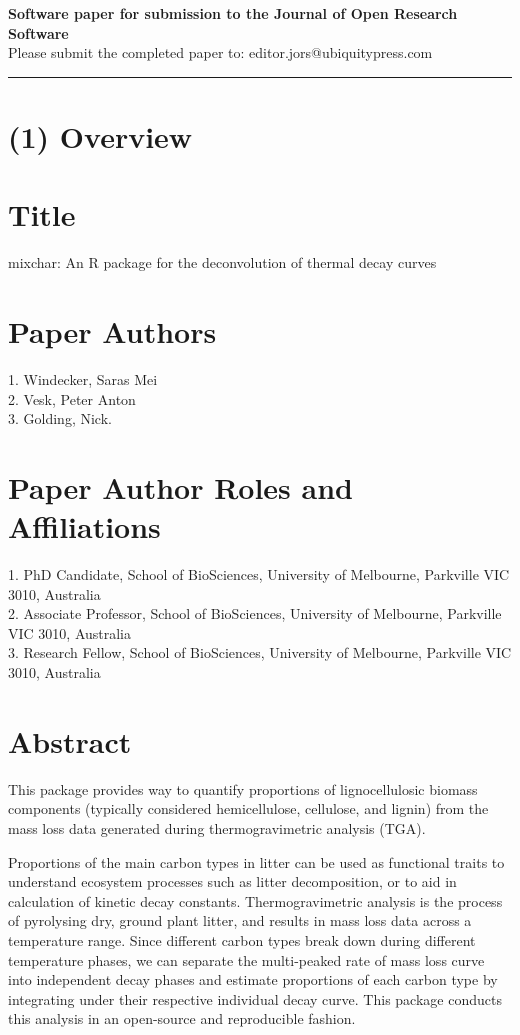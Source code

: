 \documentclass{jors}\usepackage[]{graphicx}\usepackage[]{color}
\begin{document}
{\bf Software paper for submission to the Journal of Open Research Software} \\

Please submit the completed paper to: editor.jors@ubiquitypress.com

\rule{\textwidth}{1pt}

\section*{(1) Overview}

\vspace{0.5cm}

\section*{Title}
mixchar: An R package for the deconvolution of thermal decay curves

\section*{Paper Authors}
1. Windecker, Saras Mei \\
2. Vesk, Peter Anton \\
3. Golding, Nick.

\section*{Paper Author Roles and Affiliations}
1. PhD Candidate, School of BioSciences, University of Melbourne, Parkville VIC 3010, Australia \\
2. Associate Professor, School of BioSciences, University of Melbourne, Parkville VIC 3010, Australia \\
3. Research Fellow, School of BioSciences, University of Melbourne, Parkville VIC 3010, Australia

\section*{Abstract}
This package provides way to quantify proportions of lignocellulosic biomass components (typically considered hemicellulose, cellulose, and lignin) from the mass loss data generated during thermogravimetric analysis (TGA).

Proportions of the main carbon types in litter can be used as functional traits to understand ecosystem processes such as litter decomposition, or to aid in calculation of kinetic decay constants. Thermogravimetric analysis is the process of pyrolysing dry, ground plant litter, and results in mass loss data across a temperature range. Since different carbon types break down during different temperature phases, we can separate the multi-peaked rate of mass loss curve into independent decay phases and estimate proportions of each carbon type by integrating under their respective individual decay curve. This package conducts this analysis in an open-source and reproducible fashion.
\end{document}
